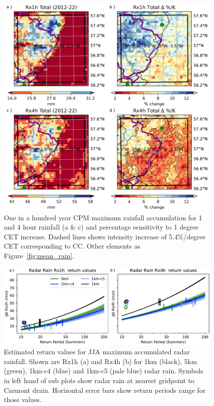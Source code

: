 \documentclass[11pt,a4paper]{article}
\begin{document}
\begin{figure}
	\centering
	\includegraphics[width=1\linewidth]{cpm_intensity_delta}
	\caption{One in a hundred year CPM maximum rainfall accumulation for 1 and 4 hour rainfall (a \& c) and percentage sensitivity to 1 degree CET increase. Dashed lines shows intensity increase of 5.4\%/degree CET corresponding to CC. Other elements as Figure~\ref{fig:mean_rain}.  }
	\label{fig:map_intensity}
\end{figure}

\begin{figure}
	\centering
	\includegraphics[width=\linewidth]{radar_return_prds}
	\caption{Estimated return values for  JJA maximum accumulated radar rainfall. Shown are Rx1h (a) and Rx4h (b) for 1km  (black),  5km (green), 1km-c4 (blue) and 1km-c5 (pale blue) radar rain. Symbols in left hand of sub plots show radar rain at nearest gridpoint to Carmont drain. Horizontal error bars show return periods range for those values. }
	\label{fig:radar_rtn_prd}
\end{figure}
\end{document}
